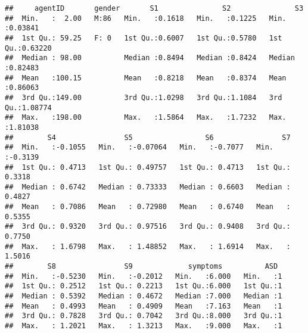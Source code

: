 \documentclass[]{article}
\newenvironment{Shaded}{\begin{snugshade}}{\end{snugshade}}
\newcommand{\KeywordTok}[1]{\textcolor[rgb]{0.13,0.29,0.53}{\textbf{#1}}}
\newcommand{\DecValTok}[1]{\textcolor[rgb]{0.00,0.00,0.81}{#1}}
\newcommand{\StringTok}[1]{\textcolor[rgb]{0.31,0.60,0.02}{#1}}
\newcommand{\CommentTok}[1]{\textcolor[rgb]{0.56,0.35,0.01}{\textit{#1}}}
\newcommand{\OperatorTok}[1]{\textcolor[rgb]{0.81,0.36,0.00}{\textbf{#1}}}
\newcommand{\NormalTok}[1]{#1}
\begin{document}
\begin{verbatim}
##     agentID       gender       S1               S2               S3         
##  Min.   :  2.00   M:86   Min.   :0.1618   Min.   :0.1225   Min.   :0.03841  
##  1st Qu.: 59.25   F: 0   1st Qu.:0.6007   1st Qu.:0.5780   1st Qu.:0.63220  
##  Median : 98.00          Median :0.8494   Median :0.8424   Median :0.82483  
##  Mean   :100.15          Mean   :0.8218   Mean   :0.8374   Mean   :0.86063  
##  3rd Qu.:149.00          3rd Qu.:1.0298   3rd Qu.:1.1084   3rd Qu.:1.08774  
##  Max.   :198.00          Max.   :1.5864   Max.   :1.7232   Max.   :1.81038  
##        S4                S5                 S6                S7         
##  Min.   :-0.1055   Min.   :-0.07064   Min.   :-0.7077   Min.   :-0.3139  
##  1st Qu.: 0.4713   1st Qu.: 0.49757   1st Qu.: 0.4713   1st Qu.: 0.3318  
##  Median : 0.6742   Median : 0.73333   Median : 0.6603   Median : 0.4827  
##  Mean   : 0.7086   Mean   : 0.72980   Mean   : 0.6740   Mean   : 0.5355  
##  3rd Qu.: 0.9320   3rd Qu.: 0.97516   3rd Qu.: 0.9408   3rd Qu.: 0.7750  
##  Max.   : 1.6798   Max.   : 1.48852   Max.   : 1.6914   Max.   : 1.5016  
##        S8                S9             symptoms          ASD   
##  Min.   :-0.5230   Min.   :-0.2012   Min.   :6.000   Min.   :1  
##  1st Qu.: 0.2512   1st Qu.: 0.2213   1st Qu.:6.000   1st Qu.:1  
##  Median : 0.5392   Median : 0.4672   Median :7.000   Median :1  
##  Mean   : 0.4993   Mean   : 0.4909   Mean   :7.163   Mean   :1  
##  3rd Qu.: 0.7828   3rd Qu.: 0.7042   3rd Qu.:8.000   3rd Qu.:1  
##  Max.   : 1.2021   Max.   : 1.3213   Max.   :9.000   Max.   :1
\end{verbatim}

\begin{Shaded}
\end{Shaded}
\end{document}
